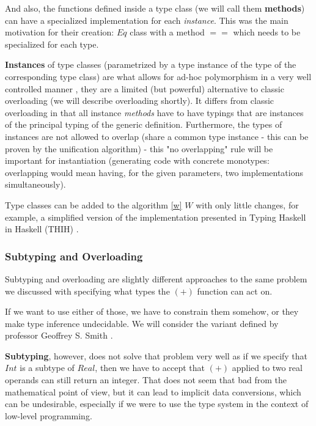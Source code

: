And also, the functions defined inside a type class (we will call them \textbf{methods}) can have a specialized implementation for each \emph{instance}. This was the main motivation for their creation: $Eq$ class with a method $==$ which needs to be specialized for each type. \cite{hall1994type}

\textbf{Instances} of type classes (parametrized by a type instance of the type of the corresponding type class) are what allows for ad-hoc polymorphism in a very well controlled manner \cite{wadler1989make}, they are a limited (but powerful) alternative to classic overloading (we will describe overloading shortly). It differs from classic overloading in that all instance \emph{methods} have to have typings that are instances of the principal typing of the generic definition. Furthermore, the types of instances are not allowed to overlap (share a common type instance - this can be proven by the unification algorithm) - this "no overlapping" rule will be important for instantiation (generating code with concrete monotypes: overlapping would mean having, for the given parameters, two implementations simultaneously).

Type classes can be added to the algorithm \ref{w} $W$ with only little changes, for example, a simplified version of the implementation presented in Typing Haskell in Haskell (THIH) \cite{jones1999typing}.

\subsubsection{Subtyping and Overloading}

Subtyping and overloading are slightly different approaches to the same problem we discussed with specifying what types the $(+)$ function can act on.

If we want to use either of those, we have to constrain them somehow, or they make type inference undecidable. We will consider the variant defined by professor Geoffrey S. Smith \cite{smith1993polymorphic}.

\textbf{Subtyping}, however, does not solve that problem very well as if we specify that $Int$ is a subtype of $Real$, then we have to accept that $(+)$ applied to two real operands can still return an integer. That does not seem that bad from the mathematical point of view, but it can lead to implicit data conversions, which can be undesirable, especially if we were to use the type system in the context of low-level programming.

